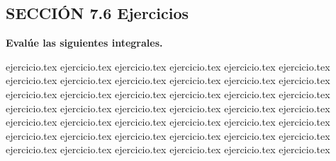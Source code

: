 
\subsection*{SECCIÓN 7.6 \quad Ejercicios}

\noindent\textbf{Evalúe las siguientes integrales.}
\begin{enumerate}
    {ejercicio.tex}
{ejercicio.tex}
{ejercicio.tex}
{ejercicio.tex}
{ejercicio.tex}
{ejercicio.tex}
{ejercicio.tex}
{ejercicio.tex}
{ejercicio.tex}
{ejercicio.tex}
{ejercicio.tex}
{ejercicio.tex}
{ejercicio.tex}
{ejercicio.tex}
{ejercicio.tex}
{ejercicio.tex}
{ejercicio.tex}
{ejercicio.tex}
{ejercicio.tex}
{ejercicio.tex}
{ejercicio.tex}
{ejercicio.tex}
{ejercicio.tex}
{ejercicio.tex}
{ejercicio.tex}
{ejercicio.tex}
{ejercicio.tex}
{ejercicio.tex}
{ejercicio.tex}
{ejercicio.tex}
{ejercicio.tex}
{ejercicio.tex}
{ejercicio.tex}
{ejercicio.tex}
{ejercicio.tex}
{ejercicio.tex}
{ejercicio.tex}
{ejercicio.tex}
{ejercicio.tex}
{ejercicio.tex}
{ejercicio.tex}
{ejercicio.tex}
\end{enumerate}

